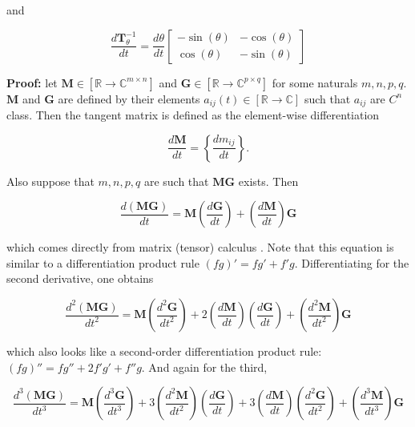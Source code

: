 \begin{lemma}
	and

\begin{equation}
        \dfrac{d\mathbf{T}^{-1}_{\theta} }{dt} =
\dfrac{d\theta}{dt}
\left[\begin{array}{cc}
         -\sin\left(\theta\right) & -\cos\left(\theta\right)                    \\[5mm]
          \cos\left(\theta\right) & -\sin\left(\theta\right)
\end{array}\right]
\end{equation}

\end{lemma}
\textbf{Proof:} let $\mathbf{M}\in\left[\mathbb{R}\to\mathbb{C}^{m\times n}\right]$ and $\mathbf{G}\in\left[\mathbb{R}\to\mathbb{C}^{p\times q}\right]$ for some naturals $m,n,p,q$. $\mathbf{M}$ and $\mathbf{G}$ are defined by their elements $a_{ij}\left(t\right)\in\left[\mathbb{R}\to\mathbb{C}\right]$ such that $a_{ij}$ are $C^n$ class. Then the tangent matrix is defined as the element-wise differentiation

\begin{equation} \dfrac{d\mathbf{M}}{dt} = \left\{\dfrac{dm_{ij}}{dt}\right\} . \end{equation}

	Also suppose that $m,n,p,q$ are such that $\mathbf{MG}$ exists. Then

\begin{equation} \dfrac{d\left(\mathbf{MG}\right)}{dt} = \mathbf{M}\left(\dfrac{d\mathbf{G}}{dt}\right) + \left(\dfrac{d\mathbf{M}}{dt}\right) \mathbf{G} \end{equation}

	\noindent which comes directly from matrix (tensor) calculus . Note that this equation is similar to a differentiation product rule $\left(fg\right)' = fg' + f'g$. Differentiating for the second derivative, one obtains

\begin{equation} \dfrac{d^2\left(\mathbf{MG}\right)}{dt^2} = \mathbf{M}\left(\dfrac{d^2\mathbf{G}}{dt^2}\right) + 2\left(\dfrac{d\mathbf{M}}{dt}\right)\left(\dfrac{d\mathbf{G}}{dt}\right) + \left(\dfrac{d^2\mathbf{M}}{dt^2}\right) \mathbf{G} \end{equation}

	\noindent which also looks like a second-order differentiation product rule: $\left(fg\right)'' = fg'' + 2f'g' + f''g$. And again for the third,

\small
\begin{equation}
	\dfrac{d^3\left(\mathbf{MG}\right)}{dt^3} = \mathbf{M}\left(\dfrac{d^3\mathbf{G}}{dt^3}\right) + 3\left(\dfrac{d^2\mathbf{M}}{dt^2}\right)\left(\dfrac{d\mathbf{G}}{dt}\right) + 3\left(\dfrac{d\mathbf{M}}{dt}\right)\left(\dfrac{d^2\mathbf{G}}{dt^2}\right) + \left(\dfrac{d^3\mathbf{M}}{dt^3}\right) \mathbf{G}
\end{equation}
\normalsize

